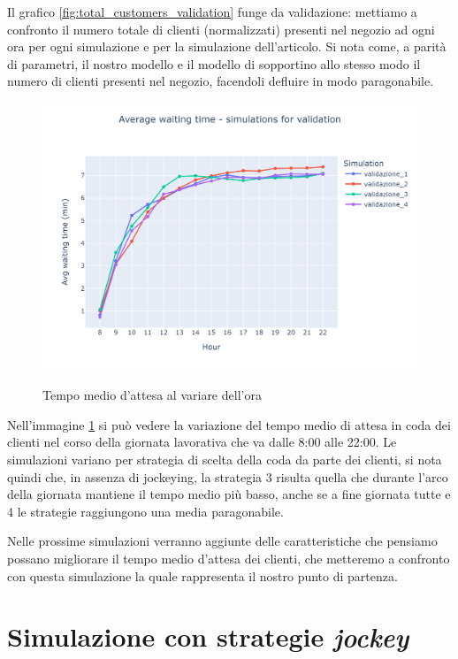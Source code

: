 Il grafico \ref{fig:total_customers_validation} funge da validazione: mettiamo a confronto il numero totale di clienti (normalizzati) presenti nel negozio ad ogni ora per ogni simulazione e per la simulazione dell'articolo. Si nota come, a parità di parametri, il nostro modello e il modello di \cite{article1} sopportino allo stesso modo il numero di clienti presenti nel negozio, facendoli defluire in modo paragonabile.

\begin{figure}[H]
	\centering
	\includegraphics[width=12cm]{"images/results/avg_wt_validation.png"}
	\label{fig:avg_wt_validation}
	\caption{Tempo medio d'attesa al variare dell'ora}
\end{figure}


Nell'immagine \ref{fig:avg_wt_validation} si può vedere la variazione del tempo medio di attesa in coda dei clienti nel corso della giornata lavorativa che va dalle 8:00 alle 22:00. Le simulazioni variano per strategia di scelta della coda da parte dei clienti, si nota quindi che, in assenza di jockeying, la strategia 3 risulta quella che durante l'arco della giornata mantiene il tempo medio più basso, anche se a fine giornata tutte e 4 le strategie raggiungono una media paragonabile.

Nelle prossime simulazioni verranno aggiunte delle caratteristiche che pensiamo possano migliorare il tempo medio d'attesa dei clienti, che metteremo a confronto con questa simulazione la quale rappresenta il nostro punto di partenza.

\section{Simulazione con strategie \textit{jockey}}

